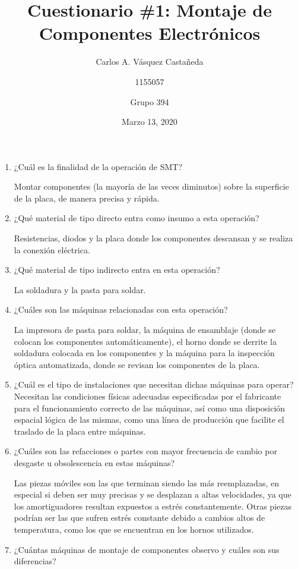 \documentclass[12pt, letterpaper]{article}
\title{Cuestionario \#1: Montaje de Componentes Electrónicos}
\author{Carlos A. Vásquez Castañeda \and 1155057 \and Grupo 394}
\date{Marzo 13, 2020}
\begin{document}
\maketitle

\begin{enumerate}
	\item ¿Cuál es la finalidad de la operación de SMT?

		Montar componentes (la mayoría de las veces diminutos) sobre la superficie de la placa, de manera precisa y rápida.

	\item ¿Qué material de tipo directo entra como insumo a esta operación?

		Resistencias, diodos y la placa donde los componentes descansan y se realiza la conexión eléctrica.

	\item ¿Qué material de tipo indirecto entra en esta operación?

		La soldadura y la pasta para soldar.

	\item ¿Cuáles son las máquinas relacionadas con esta operación?

		La impresora de pasta para soldar, la máquina de ensamblaje (donde se colocan los componentes automáticamente),  el horno donde se derrite la soldadura colocada en los componentes y la máquina para la inspección óptica automatizada, donde se revisan los componentes de la placa.

	\item ¿Cuál es el tipo de instalaciones que necesitan dichas máquinas para operar?
		Necesitan las condiciones físicas adecuadas especificadas por el fabricante para el funcionamiento correcto de las máquinas, así como una disposición espacial lógica de las mismas, como una línea de producción que facilite el traslado de la placa entre máquinas.

	\item ¿Cuáles son las refacciones o partes con mayor frecuencia de cambio por desgaste u obsolescencia en estas máquinas?

		Las piezas móviles son las que terminan siendo las más reemplazadas, en especial si deben ser muy precisas y se desplazan a altas velocidades, ya que los amortiguadores resultan expuestos a estrés constantemente. Otras piezas podrían ser las que sufren estrés constante debido a cambios altos de temperatura, como los que se encuentran en los hornos utilizados.

	\item ¿Cuántas máquinas de montaje de componentes observo y cuáles son sus diferencias?


\end{enumerate}
\end{document}
